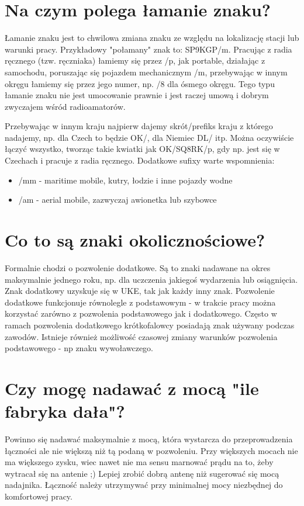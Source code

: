 \documentclass[a4paper,12pt]{article}
\begin{document}
\section{Na czym polega łamanie znaku?}
Łamanie znaku jest to chwilowa zmiana znaku ze względu na lokalizację stacji lub warunki pracy. Przykładowy "połamany" znak to: SP9KGP/m. Pracując z radia ręcznego (tzw. ręczniaka) łamiemy się przez /p, jak portable, działając z samochodu, poruszając się pojazdem mechanicznym /m, przebywając w innym okręgu łamiemy się przez jego numer, np. /8 dla ósmego okręgu. Tego typu łamanie znaku nie jest umocowanie prawnie i jest raczej umową i dobrym zwyczajem wśród radioamatorów.

Przebywając w innym kraju najpierw dajemy skrót/prefiks kraju z którego nadajemy, np. dla Czech to będzie OK/, dla Niemiec DL/ itp. Można oczywiście łączyć wszystko, tworząc takie kwiatki jak OK/SQ8RK/p, gdy np. jest się w Czechach i pracuje z radia ręcznego.
Dodatkowe sufixy warte wspomnienia:
\begin{itemize}
\item /mm - maritime mobile, kutry, łodzie i inne pojazdy wodne
\item /am - aerial mobile, zazwyczaj awionetka lub szybowce\end{itemize}

\section{Co to są znaki okolicznościowe?}
Formalnie chodzi o pozwolenie dodatkowe. Są to znaki nadawane na okres maksymalnie jednego roku, np. dla uczczenia jakiegoś wydarzenia lub osiągnięcia. Znak dodatkowy uzyskuje się w UKE, tak jak każdy inny znak. Pozwolenie dodatkowe funkcjonuje równolegle z podstawowym - w trakcie pracy można korzystać zarówno z pozwolenia podstawowego jak i dodatkowego. Często w ramach pozwolenia dodatkowego krótkofalowcy posiadają znak używany podczas zawodów. Istnieje również możliwość czasowej zmiany warunków pozwolenia podstawowego - np znaku wywoławczego. 

\section{Czy mogę nadawać z mocą "ile fabryka dała"?}
Powinno się nadawać maksymalnie z mocą, która wystarcza do przeprowadzenia łączności ale nie większą niż tą podaną w pozwoleniu. Przy większych mocach nie ma większego zysku, wiec nawet nie ma sensu marnować prądu na to, żeby wytracał się na antenie ;) Lepiej zrobić dobrą antenę niż sugerować się mocą nadajnika.
Łączność należy utrzymywać przy minimalnej mocy niezbędnej do komfortowej pracy. 
\end{document}

